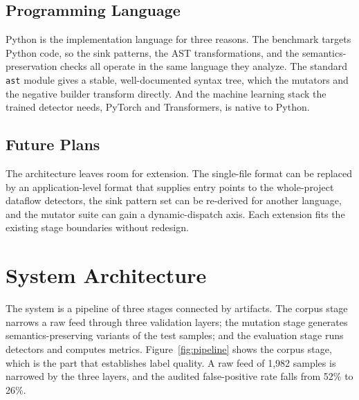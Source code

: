 \subsection{Programming Language}

Python is the implementation language for three reasons. The benchmark targets
Python code, so the sink patterns, the AST transformations, and the
semantics-preservation checks all operate in the same language they analyze. The
standard \texttt{ast} module gives a stable, well-documented syntax tree, which
the mutators and the negative builder transform directly. And the machine
learning stack the trained detector needs, PyTorch and Transformers, is native
to Python.

\subsection{Future Plans}

The architecture leaves room for extension. The single-file format can be
replaced by an application-level format that supplies entry points to the
whole-project dataflow detectors, the sink pattern set can be re-derived for
another language, and the mutator suite can gain a dynamic-dispatch axis. Each
extension fits the existing stage boundaries without redesign.

\section{System Architecture}

The system is a pipeline of three stages connected by artifacts. The corpus
stage narrows a raw feed through three validation layers; the mutation stage
generates semantics-preserving variants of the test samples; and the evaluation
stage runs detectors and computes metrics. Figure~\ref{fig:pipeline} shows the
corpus stage, which is the part that establishes label quality. A raw feed of
1{,}982 samples is narrowed by the three layers, and the audited false-positive
rate falls from 52\% to 26\%.

